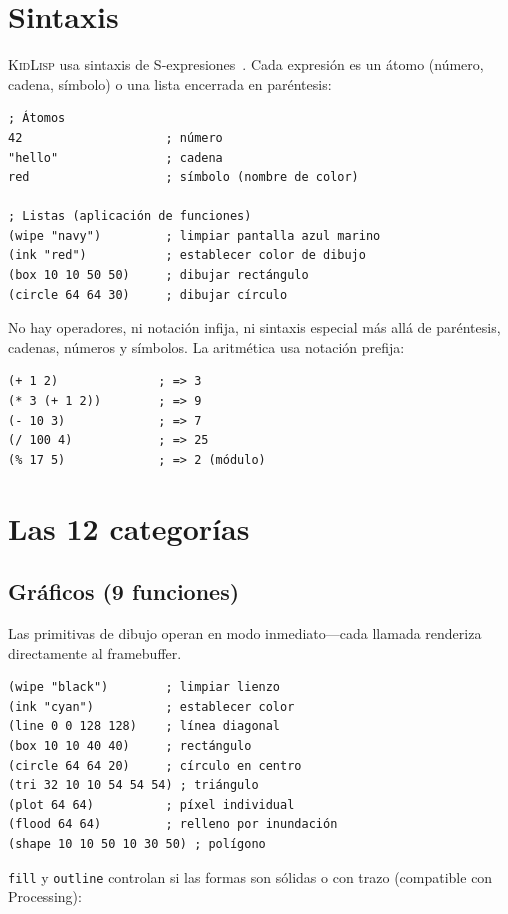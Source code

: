 \documentclass[10pt,letterpaper,twocolumn]{article}
\newcommand{\kl}{\textsc{KidLisp}}
\begin{document}
\section{Sintaxis}

\kl{} usa sintaxis de S-expresiones~\citep{mccarthy1960recursive}. Cada expresión es un átomo (número, cadena, símbolo) o una lista encerrada en paréntesis:

\begin{lstlisting}
; Átomos
42                    ; número
"hello"               ; cadena
red                   ; símbolo (nombre de color)

; Listas (aplicación de funciones)
(wipe "navy")         ; limpiar pantalla azul marino
(ink "red")           ; establecer color de dibujo
(box 10 10 50 50)     ; dibujar rectángulo
(circle 64 64 30)     ; dibujar círculo
\end{lstlisting}

No hay operadores, ni notación infija, ni sintaxis especial más allá de paréntesis, cadenas, números y símbolos. La aritmética usa notación prefija:

\begin{lstlisting}
(+ 1 2)              ; => 3
(* 3 (+ 1 2))        ; => 9
(- 10 3)             ; => 7
(/ 100 4)            ; => 25
(% 17 5)             ; => 2 (módulo)
\end{lstlisting}

\section{Las 12 categorías}

\subsection{Gráficos (9 funciones)}

Las primitivas de dibujo operan en modo inmediato---cada llamada renderiza directamente al framebuffer.

\begin{lstlisting}
(wipe "black")        ; limpiar lienzo
(ink "cyan")          ; establecer color
(line 0 0 128 128)    ; línea diagonal
(box 10 10 40 40)     ; rectángulo
(circle 64 64 20)     ; círculo en centro
(tri 32 10 10 54 54 54) ; triángulo
(plot 64 64)          ; píxel individual
(flood 64 64)         ; relleno por inundación
(shape 10 10 50 10 30 50) ; polígono
\end{lstlisting}

\texttt{fill} y \texttt{outline} controlan si las formas son sólidas o con trazo (compatible con Processing):
\end{document}
